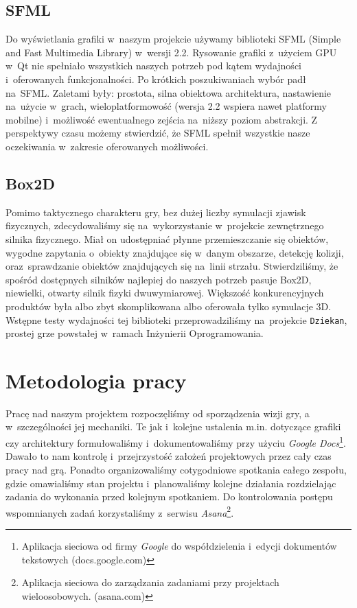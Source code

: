 \documentclass[licencjacka]{pracamgr}
\begin{document}
    \subsection{SFML}
      Do wyświetlania grafiki w~naszym projekcie używamy biblioteki SFML\cite{SFML} (Simple and Fast Multimedia Library) w~wersji
      2.2. Rysowanie grafiki z~użyciem GPU w~Qt nie spełniało wszystkich naszych potrzeb pod kątem wydajności i~oferowanych funkcjonalności.
      Po krótkich poszukiwaniach wybór padł na~SFML. Zaletami były: prostota, silna obiektowa architektura, nastawienie na~użycie w~grach,
      wieloplatformowość (wersja 2.2 wspiera nawet platformy mobilne) i~możliwość ewentualnego zejścia na~niższy poziom abstrakcji.
      Z perspektywy czasu możemy stwierdzić, że SFML spełnił wszystkie nasze oczekiwania w~zakresie oferowanych możliwości.

    \subsection{Box2D}
      Pomimo taktycznego charakteru gry, bez dużej liczby symulacji zjawisk fizycznych, zdecydowaliśmy się na~wykorzystanie
      w~projekcie zewnętrznego silnika fizycznego. Miał on udostępniać płynne przemieszczanie się obiektów, wygodne
      zapytania o~obiekty znajdujące się w~danym obszarze, detekcję kolizji, oraz~sprawdzanie obiektów znajdujących się na~linii
      strzału. Stwierdziliśmy, że spośród dostępnych silników najlepiej do naszych potrzeb pasuje Box2D\cite{BOX}, niewielki,
      otwarty silnik fizyki dwuwymiarowej. Większość konkurencyjnych produktów była albo zbyt skomplikowana albo oferowała tylko
      symulacje 3D. Wstępne testy wydajności tej biblioteki przeprowadziliśmy na~projekcie \texttt{Dziekan}, prostej grze powstałej
      w~ramach Inżynierii Oprogramowania.

  \section{Metodologia pracy}
    Pracę nad naszym projektem rozpoczęliśmy od sporządzenia wizji gry, a w~szczególności jej mechaniki. Te jak i~kolejne
    ustalenia m.in. dotyczące grafiki czy architektury formułowaliśmy i~dokumentowaliśmy przy użyciu \emph{Google Docs}\footnote{Aplikacja 
    sieciowa od firmy \emph{Google} do współdzielenia i~edycji dokumentów tekstowych (docs.google.com)}. Dawało to nam kontrolę i~przejrzystość
    założeń projektowych przez cały czas pracy nad grą. Ponadto organizowaliśmy cotygodniowe spotkania całego zespołu, gdzie omawialiśmy stan projektu
    i~planowaliśmy kolejne działania rozdzielając zadania do wykonania przed kolejnym spotkaniem. Do kontrolowania postępu wspomnianych zadań korzystaliśmy
    z~serwisu \emph{Asana}\footnote{Aplikacja sieciowa do zarządzania zadaniami przy projektach wieloosobowych. (asana.com)}.
\end{document}
